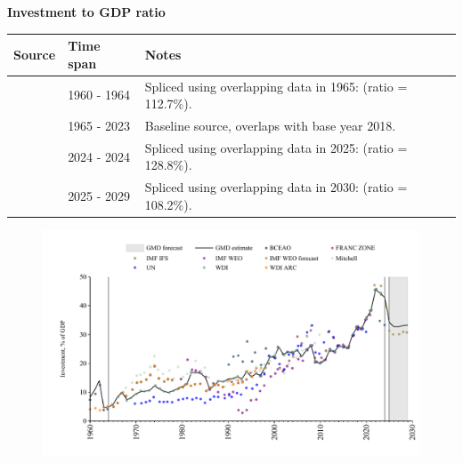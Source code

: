 \documentclass[12pt,a4paper,landscape]{article}
\begin{document}
\begin{adjustbox}{max totalsize={\paperwidth}{\paperheight},center}
\begin{minipage}[t][\textheight][t]{\textwidth}
\vspace*{0.5cm}
{}
\begin{center}
{\Large\bfseries Investment to GDP ratio}
\end{center}
\vspace{0.5cm}
\begin{table}[H]
\centering
\small
\begin{tabular}{|l|l|l|}
\hline
\textbf{Source} & \textbf{Time span} & \textbf{Notes} \\
\hline
\rowcolor{white}\cite{BCEAO}& 1960 - 1964 &Spliced using overlapping data in 1965: (ratio = 112.7\%). \\
\rowcolor{lightgray}\cite{WDI}& 1965 - 2023 &Baseline source, overlaps with base year 2018. \\
\rowcolor{white}\cite{BCEAO}& 2024 - 2024 &Spliced using overlapping data in 2025: (ratio = 128.8\%). \\
\rowcolor{lightgray}\cite{IMF_WEO_forecast}& 2025 - 2029 &Spliced using overlapping data in 2030: (ratio = 108.2\%). \\
\hline
\end{tabular}
\end{table}
\begin{figure}[H]
\centering
\includegraphics[width=\textwidth,height=0.6\textheight,keepaspectratio]{graphs/SEN_inv_GDP.pdf}
\end{figure}
\end{minipage}
\end{adjustbox}
\end{document}
